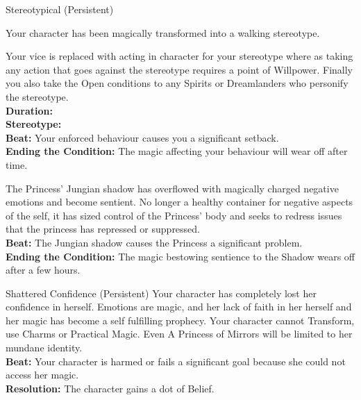 \documentclass[10pt, frontgrid, backgrid]{flacards}
\begin{document}
\Cond
{Stereotypical (Persistent)}
{Your character has been magically transformed into a walking stereotype.

Your vice is replaced with acting in character for your stereotype where as taking any action that goes against the stereotype requires a point of Willpower. Finally you also take the Open conditions to any Spirits or Dreamlanders who personify the stereotype.\\
\textbf{Duration:} \fillunderline \\
\textbf{Stereotype:} \fillunderline\\
\textbf{Beat:} Your enforced behaviour causes you a significant setback.\\
\textbf{Ending the Condition:} The magic affecting your behaviour will wear off after time.
}




{The Princess' Jungian shadow has overflowed with magically charged negative emotions and become sentient. No longer a healthy container for negative aspects of the self, it has sized control of the Princess' body and seeks to redress issues that the princess has repressed or suppressed.\\

\textbf{Beat:} The Jungian shadow causes the Princess a significant problem.\\

\textbf{Ending the Condition:} The magic bestowing sentience to the Shadow wears off after a few hours.}



\Cond
{Shattered Confidence (Persistent)}
{Your character has completely lost her confidence in herself. Emotions are magic, and her lack of faith in her herself and her magic has become a self fulfilling prophecy. Your character cannot Transform, use Charms or Practical Magic. Even A Princess of Mirrors will be limited to her mundane identity. \\
\textbf{Beat:} Your character is harmed or fails a significant goal because she could not access her magic.\\
\textbf{Resolution:} The character gains a dot of Belief.}
\end{document}
